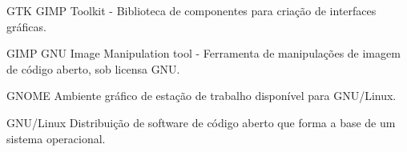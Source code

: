 
\begin{siglas}
  \item[GTK] GIMP Toolkit - Biblioteca de componentes para criação de interfaces gráficas.
  \item[GIMP] GNU Image Manipulation tool - Ferramenta de manipulações de imagem de código aberto, sob licensa GNU.
  \item[GNOME] Ambiente gráfico de estação de trabalho disponível para GNU/Linux.
  \item[GNU/Linux] Distribuição de software de código aberto que forma a base de um sistema operacional.
\end{siglas}

